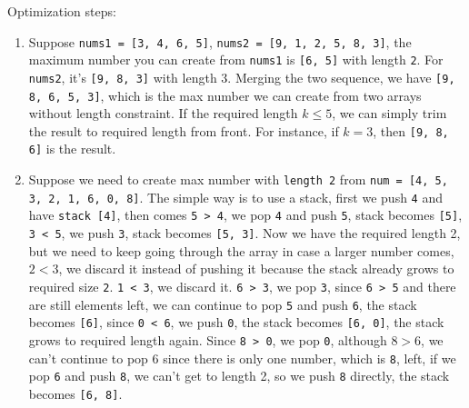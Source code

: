 \documentclass[11pt]{article}
\begin{document}
Optimization steps:
\begin{enumerate}
\item Suppose \texttt{nums1 = [3, 4, 6, 5]}, \texttt{nums2 = [9, 1, 2, 5, 8, 3]}, the maximum number you can create from \texttt{nums1} is \texttt{[6, 5]} with length \texttt{2}. For \texttt{nums2}, it's \texttt{[9, 8, 3]} with length 3. Merging the two sequence, we have \texttt{[9, 8, 6, 5, 3]}, which is the max number we can create from two arrays without length constraint. If the required length \(k \le 5\), we can simply trim the result to required length from front. For instance, if \(k = 3\), then \texttt{[9, 8, 6]} is the result.
\item Suppose we need to create max number with \texttt{length 2} from \texttt{num = [4, 5, 3, 2, 1, 6, 0, 8]}. The simple way is to use a stack, first we push \texttt{4} and have \texttt{stack [4]}, then comes \texttt{5 > 4}, we pop \texttt{4} and push \texttt{5}, stack becomes \texttt{[5]}, \texttt{3 < 5}, we push \texttt{3}, stack becomes \texttt{[5, 3]}. Now we have the required length 2, but we need to keep going through the array in case a larger number comes, \(2 < 3\), we discard it instead of pushing it because the stack already grows to required size \texttt{2}. \texttt{1 < 3}, we discard it. \texttt{6 > 3}, we pop \texttt{3}, since \texttt{6 > 5} and there are still elements left, we can continue to pop \texttt{5} and push \texttt{6}, the stack becomes \texttt{[6]}, since \texttt{0 < 6}, we push \texttt{0}, the stack becomes \texttt{[6, 0]}, the stack grows to required length again. Since \texttt{8 > 0}, we pop \texttt{0}, although \(8 > 6\), we can't continue to pop 6 since there is only one number, which is \texttt{8}, left, if we pop \texttt{6} and push \texttt{8}, we can't get to length 2, so we push \texttt{8} directly, the stack becomes \texttt{[6, 8]}.

\end{enumerate}
\end{document}
